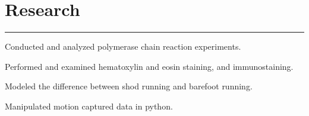 \documentclass[letterpaper]{deedy-resume} %
\newcommand{\colorrule}[1]{%
\begingroup\color{#1}\hrule\endgroup%
}%
\begin{document}
\sectionspace %



\section{Research}
\normalfont
\colorrule{black}
\vspace{2 mm}
\hfill
{}
\hfill
{}
\vspace{1 mm}
\begin{tightitemize}
	\item Conducted and analyzed polymerase chain reaction experiments.
	\item Performed and examined hematoxylin and eosin staining, and immunostaining.
\end{tightitemize}		
\sectionspace %
\vspace{2 mm}

\hfill
{}
\hfill
{}
\vspace{1 mm}
\begin{tightitemize}
	\item Modeled the difference between shod running and barefoot running. 
	\item Manipulated motion captured data in python. 
 \end{tightitemize}

\sectionspace %

\end{document}
